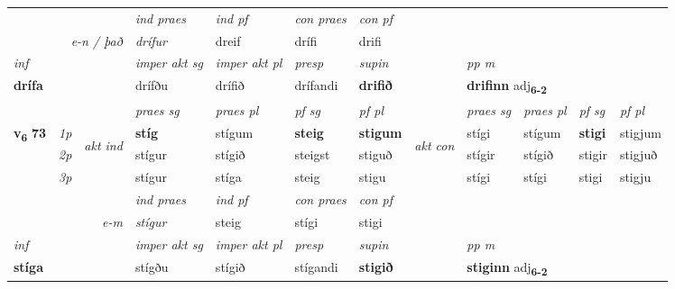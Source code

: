 \begin{longtable}[l]{X>{\footnotesize\itshape}llXXXXlXXXX}
   && &  \textit{ind praes} & \textit{ind pf} & \textit{con praes} & \textit{con pf} \\*
\multicolumn{3}{r}{\textit{e-n / það}} & drífur & dreif & drífi & drifi \\*

\cmidrule{4-7}
   {\textit{inf}} & &  & \textit{imper akt sg} & \textit{imper akt pl}   & \textit{presp} & \textit{supin}  && \textit{pp m} \\*
  {\textbf{drífa}} & && drífðu  & drífið   & drífandi &  \textbf{drifið}  && \multicolumn{2}{l}{\textbf{drifinn} adj\textbf{\textsubscript{6-2}}} \\*

\midrule

 & &   & \textit{praes sg}  & \textit{praes pl}    & \textit{ pf sg} & \textit{pf pl} & & \textit{praes sg}  & \textit{praes pl}    & \textit{pf sg} & \textit{pf pl }  \\ \cmidrule{4-7} \cmidrule{9-12}
 \multirow{2}{*}{{{\textbf{v{\textsubscript{6}}} \Large{\textbf{73}}}}}  & 1p & \multirow{3}{*}{\begin{turn}{90}\textit{akt ind}\end{turn}} & \textbf{stíg} & stígum & \textbf{steig} & \textbf{stigum} & \multirow{3}{*}{\begin{turn}{90}\textit{akt con}\end{turn}} &stígi & stígum & \textbf{stigi} & stigjum\\*
 & 2p &  &  stígur  & stígið & steigst & stiguð & & stígir & stígið & stigir & stigjuð \\*
 & 3p &  & stígur & stíga & steig & stigu & & stígi & stígi& stigi & stigju \\*
\cmidrule{4-7} \cmidrule{9-12}

   && &  \textit{ind praes} & \textit{ind pf} & \textit{con praes} & \textit{con pf} \\*
\multicolumn{3}{r}{\textit{e-m}} & stígur & steig & stígi & stigi \\*

\cmidrule{4-7}
   {\textit{inf}} & &  & \textit{imper akt sg} & \textit{imper akt pl}   & \textit{presp} & \textit{supin}  && \textit{pp m} \\*
  {\textbf{stíga}} & && stígðu  & stígið   & stígandi &  \textbf{stigið}  && \multicolumn{2}{l}{\textbf{stiginn} adj\textbf{\textsubscript{6-2}}} \\*

\midrule


\end{longtable}
